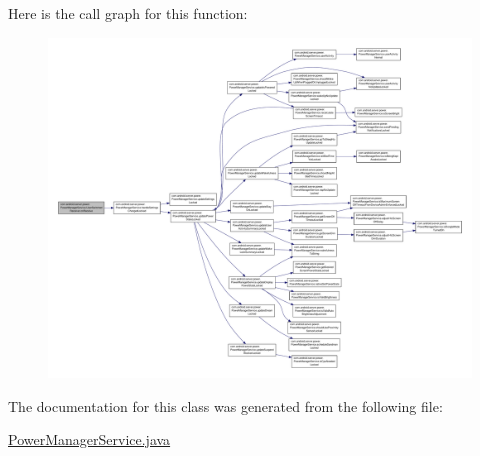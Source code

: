 Here is the call graph for this function\-:
\nopagebreak
\begin{figure}[H]
\begin{center}
\leavevmode
\includegraphics[width=350pt]{classcom_1_1android_1_1server_1_1power_1_1PowerManagerService_1_1UserSwitchedReceiver_aadc6915e1a23b4fde6be7f154f7f8178_cgraph}
\end{center}
\end{figure}




The documentation for this class was generated from the following file\-:\begin{DoxyCompactItemize}
\item 
\hyperlink{PowerManagerService_8java}{Power\-Manager\-Service.\-java}\end{DoxyCompactItemize}
